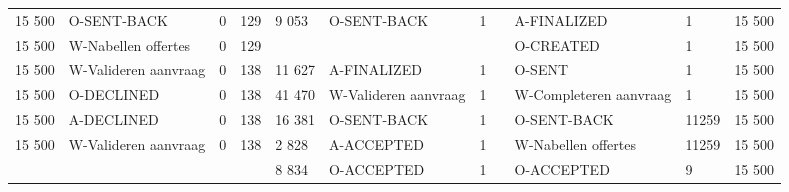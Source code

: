 \begin{tabular}{lllllllllll}
15 500 & O-SENT-BACK & 0 & 129 & 9 053 & O-SENT-BACK & 1 &  & A-FINALIZED & 1 & 15 500 \\
15 500 & W-Nabellen offertes & 0 & 129 &  &  &  &  & O-CREATED & 1 & 15 500 \\
15 500 & W-Valideren aanvraag & 0 & 138 & 11 627 & A-FINALIZED & 1 &  & O-SENT & 1 & 15 500 \\
15 500 & O-DECLINED & 0 & 138 & 41 470 & W-Valideren aanvraag & 1 &  & W-Completeren aanvraag & 1 & 15 500 \\
15 500 & A-DECLINED & 0 & 138 & 16 381 & O-SENT-BACK & 1 &  & O-SENT-BACK & 11259 & 15 500 \\
15 500 & W-Valideren aanvraag & 0 & 138 & 2 828 & A-ACCEPTED & 1 &  & W-Nabellen offertes & 11259 & 15 500 \\
 &  &  &  & 8 834 & O-ACCEPTED & 1 &  & O-ACCEPTED & 9 & 15 500 \\
\bottomrule
\end{tabular}
